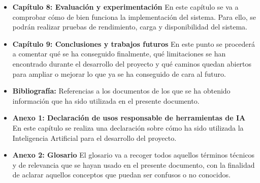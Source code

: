 \begin{itemize}
    \item \textbf{Capítulo 8: Evaluación y experimentación}
    \newline
    En este capítulo se va a comprobar cómo de bien funciona la implementación del sistema. Para ello, se podrán
    realizar pruebas de rendimiento, carga y disponibilidad del sistema. 

    \item \textbf{Capítulo 9: Conclusiones y trabajos futuros}
    \newline
    En este punto se procederá a comentar qué se ha conseguido finalmente, qué limitaciones se han encontrado durante
    el desarrollo del proyecto y qué caminos quedan abiertos para ampliar o mejorar lo que ya se ha conseguido de cara
    al futuro.

    \item \textbf{Bibliografía:}
    \newline
    Referencias a los documentos de los que se ha obtenido información que ha sido utilizada en el presente documento.

    \item \textbf{Anexo 1: Declaración de usos responsable de herramientas de IA}
    \newline
    En este capítulo se realiza una declaración sobre cómo ha sido utilizada la Inteligencia Artificial para el desarrollo
    del proyecto.

    \item \textbf{Anexo 2: Glosario}
    \newline
    El glosario va a recoger todos aquellos términos técnicos y de relevancia que se hayan usado en el presente documento,
    con la finalidad de aclarar aquellos conceptos que puedan ser confusos o no conocidos.
\end{itemize}